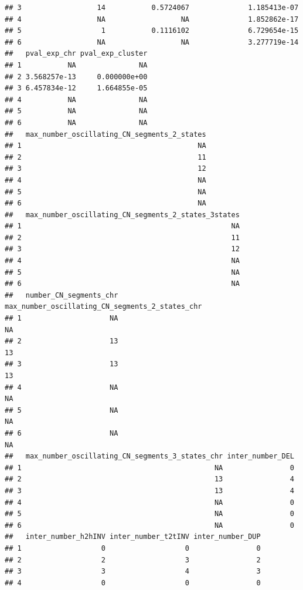 \documentclass[twoside,a4wide,11pt]{article}\usepackage[]{graphicx}\usepackage[]{color}
\makeatletter
\newenvironment{kframe}{%
 \def\at@end@of@kframe{}%
 \ifinner\ifhmode%
  \def\at@end@of@kframe{\end{minipage}}%
  \begin{minipage}{\columnwidth}%
 \fi\fi%
 \def\FrameCommand##1{\hskip\@totalleftmargin \hskip-\fboxsep
 \colorbox{shadecolor}{##1}\hskip-\fboxsep
     \hskip-\linewidth \hskip-\@totalleftmargin \hskip\columnwidth}%
 \MakeFramed {\advance\hsize-\width
   \@totalleftmargin\z@ \linewidth\hsize
   \@setminipage}}%
 {\par\unskip\endMakeFramed%
 \at@end@of@kframe}
\newenvironment{knitrout}{}{} %
\makeatother
\begin{document}
\begin{knitrout}
\begin{kframe}
\begin{verbatim}
## 3                  14           0.5724067              1.185413e-07
## 4                  NA                  NA              1.852862e-17
## 5                   1           0.1116102              6.729654e-15
## 6                  NA                  NA              3.277719e-14
##   pval_exp_chr pval_exp_cluster
## 1           NA               NA
## 2 3.568257e-13     0.000000e+00
## 3 6.457834e-12     1.664855e-05
## 4           NA               NA
## 5           NA               NA
## 6           NA               NA
##   max_number_oscillating_CN_segments_2_states
## 1                                          NA
## 2                                          11
## 3                                          12
## 4                                          NA
## 5                                          NA
## 6                                          NA
##   max_number_oscillating_CN_segments_2_states_3states
## 1                                                  NA
## 2                                                  11
## 3                                                  12
## 4                                                  NA
## 5                                                  NA
## 6                                                  NA
##   number_CN_segments_chr max_number_oscillating_CN_segments_2_states_chr
## 1                     NA                                              NA
## 2                     13                                              13
## 3                     13                                              13
## 4                     NA                                              NA
## 5                     NA                                              NA
## 6                     NA                                              NA
##   max_number_oscillating_CN_segments_3_states_chr inter_number_DEL
## 1                                              NA                0
## 2                                              13                4
## 3                                              13                4
## 4                                              NA                0
## 5                                              NA                0
## 6                                              NA                0
##   inter_number_h2hINV inter_number_t2tINV inter_number_DUP
## 1                   0                   0                0
## 2                   2                   3                2
## 3                   3                   4                3
## 4                   0                   0                0

\end{verbatim}
\end{kframe}
\end{knitrout}
\end{document}
